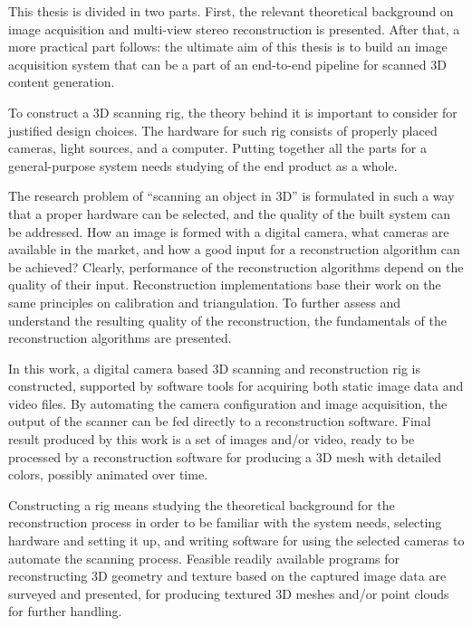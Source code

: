 
This thesis is divided in two parts.
First, the relevant theoretical background on image acquisition and multi-view stereo reconstruction is presented.
After that, a more practical part follows: the ultimate aim of this thesis is to build an image acquisition system that can be a part of an end-to-end pipeline for scanned 3D content generation.

To construct a 3D scanning rig, the theory behind it is important to consider for justified design choices.
The hardware for such rig consists of properly placed cameras, light sources, and a computer.
Putting together all the parts for a general-purpose system needs studying of the end product as a whole.

The research problem of ``scanning an object in 3D'' is formulated in such a way that a proper hardware can be selected, and the quality of the built system can be addressed.
How an image is formed with a digital camera, what cameras are available in the market, and how a good input for a reconstruction algorithm can be achieved?
Clearly, performance of the reconstruction algorithms depend on the quality of their input.
Reconstruction implementations base their work on the same principles on calibration and triangulation.
To further assess and understand the resulting quality of the reconstruction, the fundamentals of the reconstruction algorithms are presented.

In this work, a digital camera based 3D scanning and reconstruction rig is constructed, supported by software tools for acquiring both static image data and video files.
By automating the camera configuration and image acquisition, the output of the scanner can be fed directly to a reconstruction software.
Final result produced by this work is a set of images and/or video, ready to be processed by a reconstruction software for producing a 3D mesh with detailed colors, possibly animated over time.

Constructing a rig means studying the theoretical background for the reconstruction process in order to be familiar with the system needs, selecting hardware and setting it up, and writing software for using the selected cameras to automate the scanning process.
Feasible readily available programs for reconstructing 3D geometry and texture based on the captured image data are surveyed and presented, for producing textured 3D meshes and/or point clouds for further handling.

